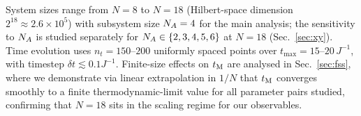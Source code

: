 System sizes range from $N = 8$ to $N = 18$ (Hilbert-space dimension $2^{18} \approx
2.6\times 10^5$) with subsystem size $N_A = 4$ for the main analysis; the sensitivity to
$N_A$ is studied separately for $N_A \in \{2, 3, 4, 5, 6\}$ at $N = 18$
(Sec.~\ref{sec:xy}). Time evolution uses $n_t = 150$--$200$ uniformly spaced points over
$t_{\max} = 15$--$20\, J^{-1}$, with timestep $\delta t \lesssim 0.1 J^{-1}$.
Finite-size effects on $t_{\rm M}$ are analysed in Sec.~\ref{sec:fss}, where we demonstrate
via linear extrapolation in $1/N$ that $t_{\rm M}$ converges smoothly to a finite
thermodynamic-limit value for all parameter pairs studied, confirming that $N = 18$ sits
in the scaling regime for our observables.
